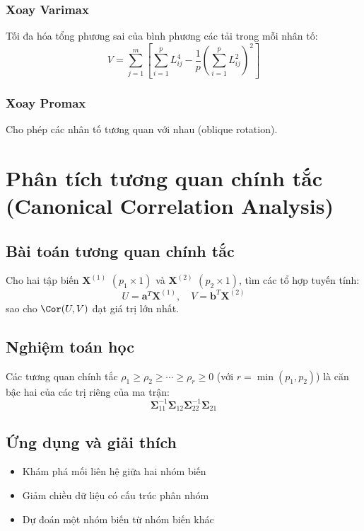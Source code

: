 \subsubsection*{Xoay Varimax}
Tối đa hóa tổng phương sai của bình phương các tải trong mỗi nhân tố:
\[
V = \sum_{j=1}^m \left[\sum_{i=1}^p L_{ij}^4 - \frac{1}{p}\left(\sum_{i=1}^p L_{ij}^2\right)^2\right]
\]

\subsubsection*{Xoay Promax}
Cho phép các nhân tố tương quan với nhau (oblique rotation).

\section{Phân tích tương quan chính tắc (Canonical Correlation Analysis)}

\subsection{Bài toán tương quan chính tắc}
Cho hai tập biến $\mathbf{X}^{(1)}$ $(p_1 \times 1)$ và $\mathbf{X}^{(2)}$ $(p_2 \times 1)$, tìm các tổ hợp tuyến tính:
\[
U = \mathbf{a}^T\mathbf{X}^{(1)}, \quad V = \mathbf{b}^T\mathbf{X}^{(2)}
\]
sao cho $\Cor(U, V)$ đạt giá trị lớn nhất.

\subsection{Nghiệm toán học}
\begin{dl}
Các tương quan chính tắc $\rho_1 \geq \rho_2 \geq \cdots \geq \rho_r \geq 0$ (với $r = \min(p_1, p_2)$) là căn bậc hai của các trị riêng của ma trận:
\[
\boldsymbol{\Sigma}_{11}^{-1}\boldsymbol{\Sigma}_{12}\boldsymbol{\Sigma}_{22}^{-1}\boldsymbol{\Sigma}_{21}
\]
\end{dl}

\subsection{Ứng dụng và giải thích}
\begin{itemize}
    \item Khám phá mối liên hệ giữa hai nhóm biến
    \item Giảm chiều dữ liệu có cấu trúc phân nhóm
    \item Dự đoán một nhóm biến từ nhóm biến khác
\end{itemize}

